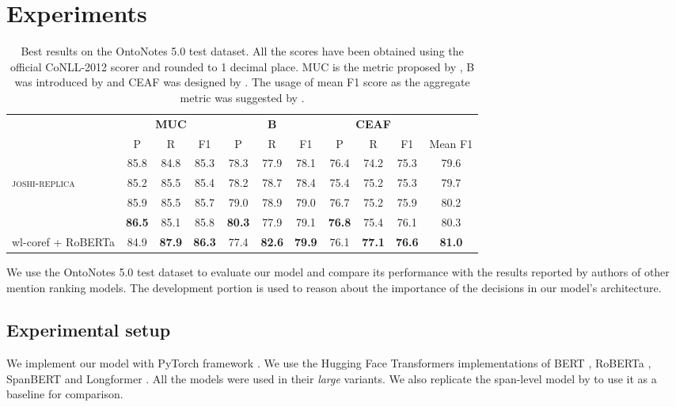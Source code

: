 \documentclass[11pt]{article}
\begin{document}
\section{Experiments}
\begin{table*}
\centering
\begin{tabular}{lcccccccccc}
\hline
& \multicolumn{3}{c}{\textbf{MUC}} & \multicolumn{3}{c}{\textbf{B}} & \multicolumn{3}{c}{\textbf{CEAF}} & \\
& P & R & F1 & P & R & F1 & P & R & F1 & Mean F1 \\ \hline

\citet{joshi-etal-2020-spanbert} &
85.8 & 84.8 & 85.3 &
78.3 & 77.9 & 78.1 &
76.4 & 74.2 & 75.3 &
79.6 \\

\textsc{joshi-replica} &
85.2 & 85.5 & 85.4 &
78.2 & 78.7 & 78.4 &
75.4 & 75.2 & 75.3 &
79.7 \\

\citet{xu-choi-2020-revealing} &
85.9 & 85.5 & 85.7 &
79.0 & 78.9 & 79.0 &
76.7 & 75.2 & 75.9 &
80.2 \\

\citet{kirstain-etal-2021-no-span} &
\textbf{86.5} & 85.1 & 85.8 &
\textbf{80.3} & 77.9 & 79.1 &
\textbf{76.8} & 75.4 & 76.1 &
80.3 \\

\hline

wl-coref + RoBERTa &
84.9 & \textbf{87.9} & \textbf{86.3} &
77.4 & \textbf{82.6} & \textbf{79.9} &
76.1 & \textbf{77.1} & \textbf{76.6} &
\textbf{81.0} \\

\hline
\end{tabular}
\caption{\label{table_test} Best results on the OntoNotes 5.0 test dataset. All the scores have been obtained using the official CoNLL-2012 scorer \citep{pradhan-etal-2014-scoring} and rounded to 1 decimal place. MUC is the metric proposed by \citet{vilain-etal-1995-model}, B was introduced by \citet{Bagga98algorithmsfor} and CEAF was designed by \citet{luo-2005-coreference}. The usage of mean F1 score as the aggregate metric was suggested by \citet{pradhan-etal-2012-conll}. }
\end{table*} 
We use the OntoNotes 5.0 test dataset to evaluate our model and compare its performance with the results reported by authors of other mention ranking models. The development portion is used to reason about the importance of the decisions in our model's architecture.

\subsection{Experimental setup} We implement our model with PyTorch framework \citep{pytorch}. We use the Hugging Face Transformers \citep{wolf-etal-2020-transformers} implementations of BERT \citep{devlin-etal-2019-bert}, RoBERTa \citep{liu2019roberta}, SpanBERT \citep{joshi-etal-2020-spanbert} and Longformer \citep{longformer}. All the models were used in their \emph{large} variants.
We also replicate the span-level model by \citet{joshi-etal-2020-spanbert} to use it as a baseline for comparison.
\end{document}
